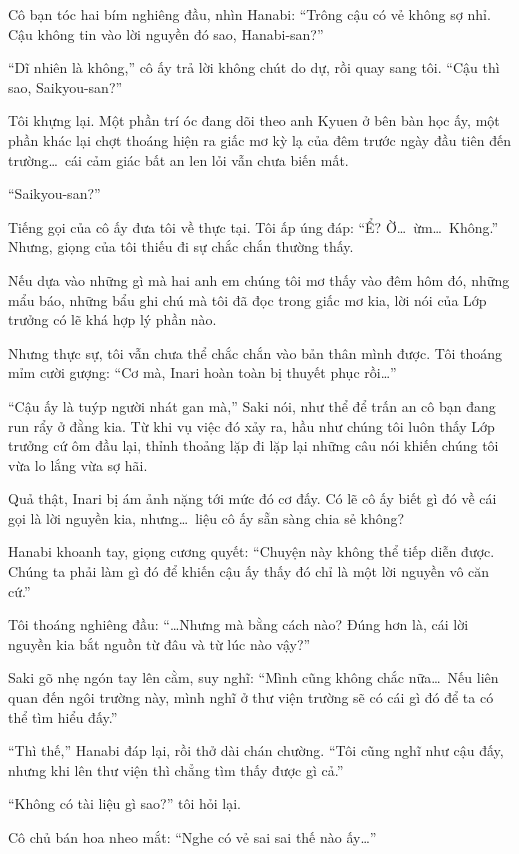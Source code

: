\documentclass[../main.tex]{subfiles}
\begin{document}
Cô bạn tóc hai bím nghiêng đầu, nhìn Hanabi: ``Trông cậu có vẻ không sợ nhỉ. Cậu không tin vào lời nguyền đó sao, Hanabi-san?''

``Dĩ nhiên là không,'' cô ấy trả lời không chút do dự, rồi quay sang tôi. ``Cậu thì sao, Saikyou-san?''

Tôi khựng lại. Một phần trí óc đang dõi theo anh Kyuen ở bên bàn học ấy, một phần khác lại chợt thoáng hiện ra giấc mơ kỳ lạ của đêm trước ngày đầu tiên đến trường\dots\ cái cảm giác bất an len lỏi vẫn chưa biến mất.

``Saikyou-san?''

Tiếng gọi của cô ấy đưa tôi về thực tại. Tôi ấp úng đáp: ``Ể? Ờ\dots\ ừm\dots\ Không.'' Nhưng,  giọng của tôi thiếu đi sự chắc chắn thường thấy.

Nếu dựa vào những gì mà hai anh em chúng tôi mơ thấy vào đêm hôm đó, những mẩu báo, những bẩu ghi chú mà tôi đã đọc trong giấc mơ kia, lời nói của Lớp trưởng có lẽ khá hợp lý phần nào.

Nhưng thực sự, tôi vẫn chưa thể chắc chắn vào bản thân mình được. Tôi thoáng mỉm cười gượng: ``Cơ mà, Inari hoàn toàn bị thuyết phục rồi\dots''

``Cậu ấy là tuýp người nhát gan mà,'' Saki nói, như thể để trấn an cô bạn đang run rẩy ở đằng kia. Từ khi vụ việc đó xảy ra, hầu như chúng tôi luôn thấy Lớp trưởng cứ ôm đầu lại, thỉnh thoảng lặp đi lặp lại những câu nói khiến chúng tôi vừa lo lắng vừa sợ hãi.

Quả thật, Inari bị ám ảnh nặng tới mức đó cơ đấy. Có lẽ cô ấy biết gì đó về cái gọi là lời nguyền kia, nhưng\dots\ liệu cô ấy sẵn sàng chia sẻ không?

Hanabi khoanh tay, giọng cương quyết: ``Chuyện này không thể tiếp diễn được. Chúng ta phải làm gì đó để khiến cậu ấy thấy đó chỉ là một lời nguyền vô căn cứ.''

Tôi thoáng nghiêng đầu: ``\dots Nhưng mà bằng cách nào? Đúng hơn là, cái lời nguyền kia bắt nguồn từ đâu và từ lúc nào vậy?''

Saki gõ nhẹ ngón tay lên cằm, suy nghĩ: ``Mình cũng không chắc nữa\dots\ Nếu liên quan đến ngôi trường này, mình nghĩ ở thư viện trường sẽ có cái gì đó để ta có thể tìm hiểu đấy.''

``Thì thế,'' Hanabi đáp lại, rồi thở dài chán chường. ``Tôi cũng nghĩ như cậu đấy, nhưng khi lên thư viện thì chẳng tìm thấy được gì cả.''

``Không có tài liệu gì sao?'' tôi hỏi lại.

Cô chủ bán hoa nheo mắt: ``Nghe có vẻ sai sai thế nào ấy\dots''
\end{document}
